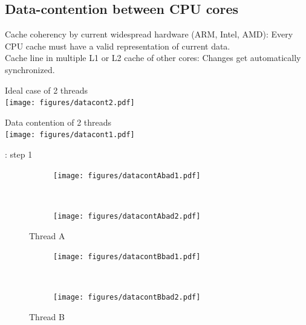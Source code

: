 \documentclass{beamer}
\begin{document}
\subsection{Data-contention between CPU cores}
\begin{frame}{\insertsubsection}
  Cache coherency by current widespread hardware (ARM, Intel, AMD): Every CPU cache must have a valid representation of current data.\\
  Cache line in multiple L1 or L2 cache of other cores: Changes get automatically synchronized.\\
  \vspace{1cm}
\begin{minipage}{0.5\linewidth}
Ideal case of 2 threads\\
  \vspace{0.3cm}
  \texttt{[image: figures/datacont2.pdf]}
\end{minipage}%
\begin{minipage}{0.5\linewidth}
Data contention of 2 threads\\
  \vspace{0.3cm}
  \texttt{[image: figures/datacont1.pdf]}
\end{minipage}%
\end{frame}
\begin{frame}{\insertsubsection : step 1}
\centering
\begin{minipage}{0.5\linewidth}
\begin{figure}[h]%
  \begin{subfigure}[b]{\linewidth}%
  \texttt{[image: figures/datacontAbad1.pdf]}
  \end{subfigure}\\
  \vspace{1cm}
  \begin{subfigure}[b]{\linewidth}%
  \texttt{[image: figures/datacontAbad2.pdf]}
  \end{subfigure}%
  \caption{Thread A}
\end{figure}%
\end{minipage}%
\begin{minipage}{0.5\linewidth}
\begin{figure}[h]%
  \begin{subfigure}[b]{\linewidth}%
  \texttt{[image: figures/datacontBbad1.pdf]}
  \end{subfigure}\\
  \vspace{1cm}
  \begin{subfigure}[b]{\linewidth}%
  \texttt{[image: figures/datacontBbad2.pdf]}
  \end{subfigure}%
  \caption{Thread B}
\end{figure}%
\end{minipage}
\end{frame}
\end{document}
